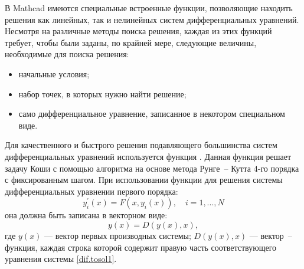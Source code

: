 В Mathcad имеются специальные встроенные функции, позволяющие находить решения как линейных, так и нелинейных систем дифференциальных уравнений. Несмотря на различные методы поиска решения, каждая из этих функций требует, чтобы были заданы, по крайней мере, следующие величины, необходимые для поиска решения:
\begin{itemize}
	\item начальные условия; 
	\item набор точек, в которых нужно найти решение;
	\item само дифференциальное уравнение, записанное в некотором специальном виде.
\end{itemize}
Для качественного и быстрого решения подавляющего большинства систем дифференциальных уравнений используется функция . Данная функция решает задачу Коши с помощью алгоритма на основе метода Рунге~-- Кутта 4-го порядка с фиксированным шагом.
При использовании функции  для решения системы дифференциальных уравнении первого порядка:
\begin{equation}\label{dif.tosol1}
y_i^{\prime}(x)=F(x,y_i(x)),\quad i=1, ... ,N
\end{equation}
она должна быть записана в векторном виде:
\begin{equation}\label{dif.tosol2}
y(x)=D(y(x),x),
\end{equation}
где $y(x)$ --- вектор первых производных системы; $D(y(x),x)$ --- вектор~-- функция, каждая строка которой содержит правую часть соответствующего уравнения системы \ref{dif.tosol1}.

